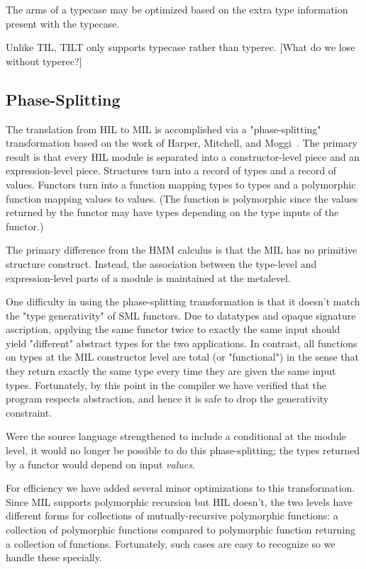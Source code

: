 \documentclass[12pt,twoside]{article}
\begin{document}
The arms of a typecase may be optimized based on the extra type
information present with the typecase.

Unlike TIL, TILT only supports typecase rather than typerec.
[What do we lose without typerec?]

\subsection{Phase-Splitting}

The translation from HIL to MIL is accomplished via a
"phase-splitting" transformation based on the work of Harper,
Mitchell, and Moggi~\cite{HMM}.  The primary result is that every HIL
module is separated into a constructor-level piece and an
expression-level piece.  Structures turn into a record of types and a
record of values.  Functors turn into a function mapping types to
types and a polymorphic function mapping values to values.  (The
function is polymorphic since the values returned by the functor may
have types depending on the type inputs of the functor.)

The primary difference from the HMM calculus is that the MIL
has no primitive structure construct.  Instead, the association
between the type-level and expression-level parts of a module
is maintained at the metalevel.

One difficulty in using the phase-splitting transformation is
that it doesn't match the "type generativity" of SML functors.
Due to datatypes and opaque signature ascription, applying the
same functor twice to exactly the same input should yield
"different" abstract types for the two applications.  In contrast,
all functions on types at the MIL constructor level are total
(or "functional") in the sense that they return exactly
the same type every time they are given the same input types.
Fortunately, by this point in the compiler we have verified
that the program respects abstraction, and hence it is safe
to drop the generativity constraint.

Were the source language strengthened to include a conditional at the
module level, it would no longer be possible to do this
phase-splitting; the types returned by a functor would depend on input
\emph{values}.

For efficiency we have added several minor optimizations to this
transformation.  Since MIL supports polymorphic recursion but
HIL doesn't, the two levels have different forms for collections of 
mutually-recursive polymorphic functions:  a collection of polymorphic
functions compared to polymorphic function returning a collection
of functions.  Fortunately, such cases are easy to recognize so we
handle these specially.
\end{document}
